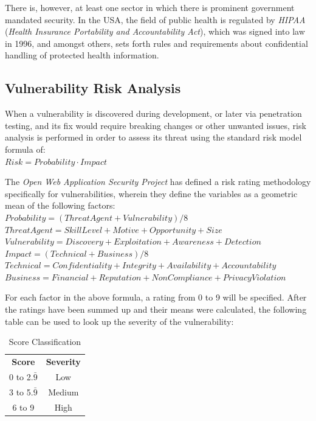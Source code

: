 \documentclass[a4paper,12pt]{article}
\begin{document}
	There is, however, at least one sector in which there is prominent government mandated security. In the USA, the field of public health is regulated by \textit{HIPAA} (\textit{Health Insurance Portability and Accountability Act}), which was signed into law\cite{hipaa96} in 1996, and amongst others, sets forth rules and requirements about confidential handling of protected health information.
	
\newpage
\subsection{Vulnerability Risk Analysis} \label{ssec:vulnriskanal}

	When a vulnerability is discovered during development, or later via penetration testing, and its fix would require breaking changes or other unwanted issues, risk analysis is performed in order to assess its threat using the standard risk model formula of:
	\vspace{1.25em}\\
	$ Risk = Probability \cdot Impact $
	
	The \textit{Open Web Application Security Project} has defined a risk rating methodology\cite{owasp4} specifically for vulnerabilities, wherein they define the variables as a geometric mean of the following factors:
	\vspace{1.25em}\\
	$ Probability = (Threat Agent + Vulnerability) / 8 $\\
	\indent $ Threat Agent = Skill Level + Motive + Opportunity + Size $\\
	\indent $ Vulnerability = Discovery + Exploitation + Awareness + Detection $\\
	$ Impact = (Technical + Business) / 8 $\\
	\indent $ Technical = Confidentiality + Integrity + Availability + Accountability $\\
	\indent $ Business = Financial + Reputation + NonCompliance + Privacy Violation $
	
	For each factor in the above formula, a rating from 0 to 9 will be specified. After the ratings have been summed up and their means were calculated, the following table can be used to look up the severity of the vulnerability:
	
	\begin{table}[!htbp]
		\centering
		\begin{tabular}{cc}
			{\bf Score} & {\bf Severity} \\
			0 to 2.$\bar{9}$ & \cellcolor[HTML]{FCFF2F}Low \\
			3 to 5.$\bar{9}$ & \cellcolor[HTML]{F8A102}Medium \\
			6 to 9 & \cellcolor[HTML]{FE0000}High
		\end{tabular}
		\caption{Score Classification}
		\label{scoreclass}
	\end{table}
	
\end{document}
